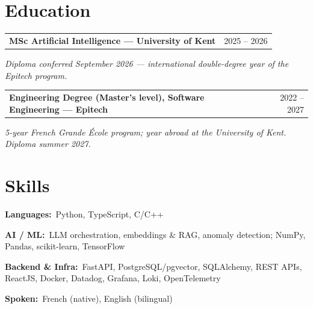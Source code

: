 \documentclass[10pt,a4paper]{article}
\makeatletter
\newcommand{\entry}[2]{%
  \vspace{1pt}\noindent\begin{tabular*}{\textwidth}{@{}l@{\extracolsep{\fill}}r@{}}
  \textbf{#1} & #2 \\
  \end{tabular*}\par}
\newcommand{\subentry}[1]{\noindent\textit{#1}\par\vspace{1pt}}
\newcommand{\skillrow}[2]{\noindent\textbf{#1:}~#2\par\vspace{1pt}}
\makeatother
\begin{document}
\section{Education}

\entry{MSc Artificial Intelligence --- University of Kent}{2025 -- 2026}
\subentry{Diploma conferred September 2026 --- international double-degree year of the Epitech program.}

\entry{Engineering Degree (Master's level), Software Engineering --- Epitech}{2022 -- 2027}
\subentry{5-year French \textit{Grande École} program; year abroad at the University of Kent. Diploma summer 2027.}

\section{Skills}
\skillrow{Languages}{Python, TypeScript, C/C++}
\skillrow{AI / ML}{LLM orchestration, embeddings \& RAG, anomaly detection; NumPy, Pandas, scikit-learn, TensorFlow}
\skillrow{Backend \& Infra}{FastAPI, PostgreSQL/pgvector, SQLAlchemy, REST APIs, ReactJS, Docker, Datadog, Grafana, Loki, OpenTelemetry}
\skillrow{Spoken}{French (native), English (bilingual)}
\end{document}
